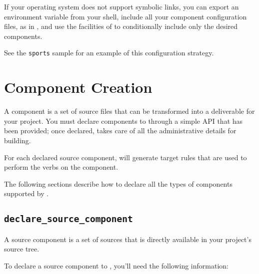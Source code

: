 If your operating system does not support symbolic links, you can
export an environment variable from your shell, include all your
component configuration files, as in , and use
the facilities of \gnumake to conditionally include only the desired
components.

See the \texttt{sports} sample for an example of this configuration
strategy.

\section{Component Creation}\label{wrap:component-creation}
\label{wrap:source-components}

A component is a set of source files that can be transformed into a
deliverable for your project.  You must declare components to \lmsbw
through a simple API that has been provided; once declared, \lmsbw
takes care of all the administrative details for building.

For each declared source component, \lmsbw will generate target
\makefile rules that are used to perform the \lmsbw verbs on the component.

The following sections describe how to declare all the types of
components supported by \lmsbw.

\subsection{\texttt{declare\_source\_component}}

A source component is a set of sources that is directly available in
your project's source tree.

To declare a source component to \lmsbw, you'll need the following
information:

